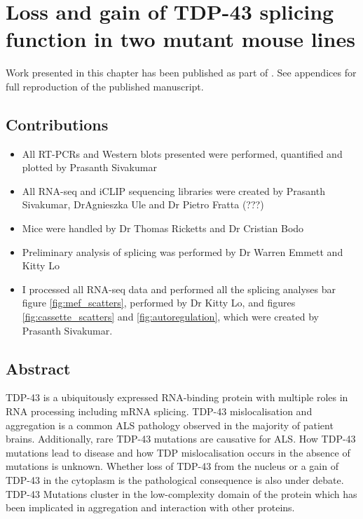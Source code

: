 \chapter{Loss and gain of TDP-43 splicing function in two mutant mouse lines}
\label{chapter:tdp_mice}

Work presented in this chapter has been published as part of \citep{Fratta2018}. See appendices for full reproduction of the published manuscript.

\section{Contributions}
\begin{itemize}
	\item All RT-PCRs and Western blots presented were performed, quantified and plotted by Prasanth Sivakumar
	\item All RNA-seq and iCLIP sequencing libraries were created by Prasanth Sivakumar, DrAgnieszka Ule and Dr Pietro Fratta (???)
	\item Mice were handled by Dr Thomas Ricketts and Dr Cristian Bodo
	\item Preliminary analysis of splicing was performed by Dr Warren Emmett and Kitty Lo
	\item I processed all RNA-seq data and performed all the splicing analyses bar figure \ref{fig:mef_scatters}, performed by Dr Kitty Lo, and figures \ref{fig:cassette_scatters} and \ref{fig:autoregulation}, which were created by Prasanth Sivakumar.
\end{itemize}



\section{Abstract}

TDP-43 is a ubiquitously expressed RNA-binding protein with multiple roles in RNA processing including mRNA splicing.
TDP-43 mislocalisation and aggregation is a common ALS pathology observed in the majority of patient brains.
Additionally, rare  TDP-43 mutations are causative for ALS. 
How TDP-43 mutations lead to disease and how TDP mislocalisation occurs in the absence of mutations is unknown. 
Whether loss of TDP-43 from the nucleus or a gain of TDP-43 in the cytoplasm is the pathological consequence is also under debate.
TDP-43 Mutations cluster in the low-complexity domain of the protein which has been implicated in aggregation and interaction with other proteins.



